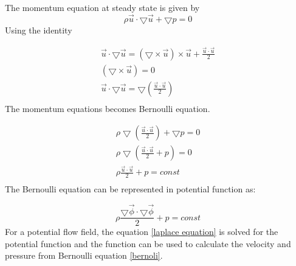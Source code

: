 \documentclass[12pt]{elsarticle}
\begin{document}
	The momentum equation at steady state is given by 
	\begin{equation}
		\rho \overrightarrow{u} \cdot \bigtriangledown  \overrightarrow{u}+\bigtriangledown p=0
	\end{equation}
	Using the identity
	
	\begin{equation}
		\begin{gathered}
			\overrightarrow{u} \cdot \bigtriangledown\overrightarrow{u}= \left(\bigtriangledown \times \overrightarrow{u} \right) \times \overrightarrow{u} + \frac{ \overrightarrow{u} \cdot \overrightarrow{u}}{2}\\
			\left(\bigtriangledown \times \overrightarrow{u} \right)=0\\
			\overrightarrow{u} \cdot \bigtriangledown\overrightarrow{u}= \bigtriangledown \left(\frac{\overrightarrow{u} \cdot \overrightarrow{u}}{2}\right)\\
		\end{gathered}
	\end{equation}
	The momentum equations becomes Bernoulli equation.
	
	\begin{equation}
		\begin{gathered}
			\rho \bigtriangledown \left(\frac{\overrightarrow{u} \cdot \overrightarrow{u}}{2}\right)+\bigtriangledown p=0\\
			\rho \bigtriangledown \left(\frac{\overrightarrow{u} \cdot \overrightarrow{u}}{2}+p\right)=0\\
			\rho \frac{\overrightarrow{u} \cdot \overrightarrow{u}}{2}+p=const\\
		\end{gathered}
	\end{equation}
	The Bernoulli equation can be represented in potential function as:
	
	\begin{equation} \label{bernoli}
		\rho \frac{\bigtriangledown \overrightarrow{\phi} \cdot \bigtriangledown \overrightarrow{\phi}}{2}+p=const
	\end{equation}
	For a potential flow field, the equation \ref{laplace equation} is solved for the potential function and the function can be used to calculate the velocity and  pressure from Bernoulli equation \ref{bernoli}.
\end{document}
